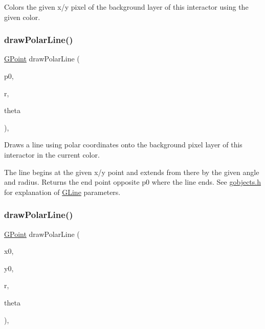 Colors the given x/y pixel of the background layer of this interactor using the given color. 

\mbox{\label{classsgl_1_1GDrawingSurface_af70cce1e4f708f1ed5b6f29cecb660e7}} 
\subsubsection{\texorpdfstring{draw\+Polar\+Line()}{drawPolarLine()}\hspace{0.1cm}{\footnotesize\ttfamily [1/2]}}
{\footnotesize\ttfamily \mbox{\hyperlink{structsgl_1_1GPoint}{G\+Point}} draw\+Polar\+Line (\begin{DoxyParamCaption}\item[{const \mbox{\hyperlink{structsgl_1_1GPoint}{G\+Point}} \&}]{p0,  }\item[{double}]{r,  }\item[{double}]{theta }\end{DoxyParamCaption})\hspace{0.3cm}{\ttfamily [virtual]}, {\ttfamily [inherited]}}



Draws a line using polar coordinates onto the background pixel layer of this interactor in the current color. 

The line begins at the given x/y point and extends from there by the given angle and radius. Returns the end point opposite p0 where the line ends. See \mbox{\hyperlink{gobjects_8h_source}{gobjects.\+h}} for explanation of \mbox{\hyperlink{classsgl_1_1GLine}{G\+Line}} parameters. \mbox{\label{classsgl_1_1GDrawingSurface_ad3e646f90005295f2bbdf37d2bcb39d2}} 
\subsubsection{\texorpdfstring{draw\+Polar\+Line()}{drawPolarLine()}\hspace{0.1cm}{\footnotesize\ttfamily [2/2]}}
{\footnotesize\ttfamily \mbox{\hyperlink{structsgl_1_1GPoint}{G\+Point}} draw\+Polar\+Line (\begin{DoxyParamCaption}\item[{double}]{x0,  }\item[{double}]{y0,  }\item[{double}]{r,  }\item[{double}]{theta }\end{DoxyParamCaption})\hspace{0.3cm}{\ttfamily [virtual]}, {\ttfamily [inherited]}}




